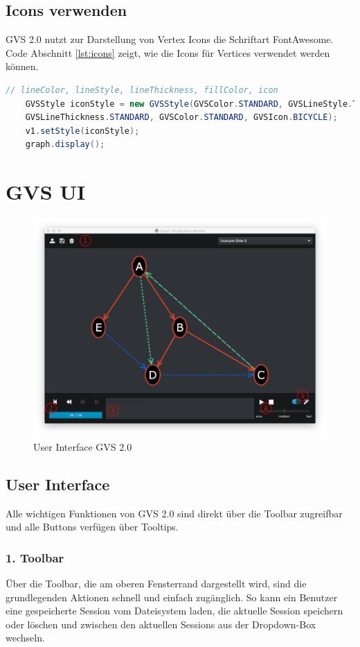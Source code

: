 \documentclass[11pt,a4paper,english,oneside]{book}
\numberwithin{equation}{chapter}
\begin{document}
	\subsection{Icons verwenden}
	GVS 2.0 nutzt zur Darstellung von Vertex Icons die Schriftart FontAwesome. Code Abschnitt \ref{lst:icons} zeigt, wie die Icons für Vertices verwendet werden können.
	
	\begin{lstlisting}[language=java, frame=single, caption={Icons benutzen}, label={lst:icons}]
	// lineColor, lineStyle, lineThickness, fillColor, icon
	GVSStyle iconStyle = new GVSStyle(GVSColor.STANDARD, GVSLineStyle.THROUGH,
	GVSLineThickness.STANDARD, GVSColor.STANDARD, GVSIcon.BICYCLE);
	v1.setStyle(iconStyle);
	graph.display();
	\end{lstlisting}	
	
	\clearpage
	
	\section{GVS UI}
		\begin{figure}[h!]
		\centering
		\includegraphics[width=0.7\linewidth]{assets/images/gvs-ui-graph}
		\caption{User Interface GVS 2.0}
		\label{fig:gvs-ui-graph}
	\end{figure}

	\subsection{User Interface}
	Alle wichtigen Funktionen von GVS 2.0 sind direkt über die Toolbar zugreifbar und alle Buttons verfügen über Tooltips. 
	
	\subsubsection{1. Toolbar}
	Über die Toolbar, die am oberen Fensterrand dargestellt wird, sind die grundlegenden Aktionen schnell und einfach zugänglich. So kann ein Benutzer eine gespeicherte Session vom Dateisystem laden, die aktuelle Session speichern oder löschen und zwischen den aktuellen Sessions aus der Dropdown-Box wechseln. 
	
\end{document}

